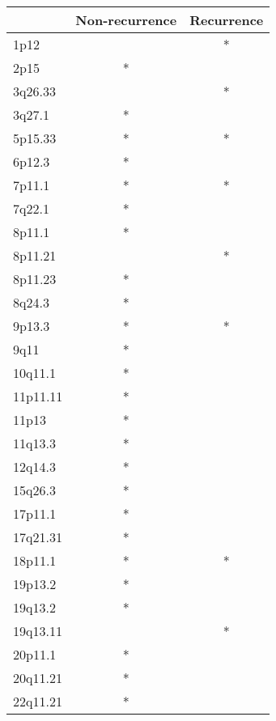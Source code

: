 \begin{tabular}{lcc}
\toprule
{} & Non-recurrence & Recurrence \\
\midrule
1p12     &                &          * \\
2p15     &              * &            \\
3q26.33  &                &          * \\
3q27.1   &              * &            \\
5p15.33  &              * &          * \\
6p12.3   &              * &            \\
7p11.1   &              * &          * \\
7q22.1   &              * &            \\
8p11.1   &              * &            \\
8p11.21  &                &          * \\
8p11.23  &              * &            \\
8q24.3   &              * &            \\
9p13.3   &              * &          * \\
9q11     &              * &            \\
10q11.1  &              * &            \\
11p11.11 &              * &            \\
11p13    &              * &            \\
11q13.3  &              * &            \\
12q14.3  &              * &            \\
15q26.3  &              * &            \\
17p11.1  &              * &            \\
17q21.31 &              * &            \\
18p11.1  &              * &          * \\
19p13.2  &              * &            \\
19q13.2  &              * &            \\
19q13.11 &                &          * \\
20p11.1  &              * &            \\
20q11.21 &              * &            \\
22q11.21 &              * &            \\
\bottomrule
\end{tabular}
